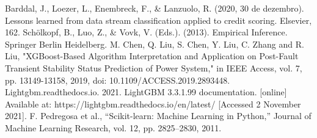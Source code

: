 \begin{thebibliography}{00}
     Barddal, J., Loezer, L., Enembreck, F., \& Lanzuolo, R. (2020, 30 de dezembro). Lessons learned from data stream classification applied to credit scoring. Elsevier, 162.
     Schölkopf, B., Luo, Z., \& Vovk, V. (Eds.). (2013). Empirical Inference. Springer Berlin Heidelberg.
     M. Chen, Q. Liu, S. Chen, Y. Liu, C. Zhang and R. Liu, "XGBoost-Based Algorithm Interpretation and Application on Post-Fault Transient Stability Status Prediction of Power System," in IEEE Access, vol. 7, pp. 13149-13158, 2019, doi: 10.1109/ACCESS.2019.2893448.
     Lightgbm.readthedocs.io. 2021. LightGBM 3.3.1.99 documentation. [online] Available at: https://lightgbm.readthedocs.io/en/latest/ [Accessed 2 November 2021].
     F. Pedregosa et al., “Scikit-learn: Machine Learning in Python,” Journal of Machine Learning Research, vol. 12, pp. 2825–2830, 2011.
\end{thebibliography}
